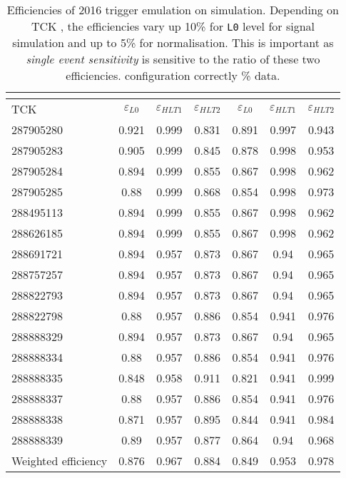 \begin{table}[H]
\begin{center}
\begin{tabular}{ l |  c  c  c | c  c  c }\toprule
	\multicolumn{1}{c|}{} & \multicolumn{3}{c|}{\Bmumumu } & \multicolumn{3}{c}{\bjpsimumuk} \\ \hline
 TCK & $\varepsilon_{L0}$ & $\varepsilon_{HLT1}$ & $\varepsilon_{HLT2}$ & $\varepsilon_{L0}$ & $\varepsilon_{HLT1}$ & $\varepsilon_{HLT2}$ \\
\hline
287905280 & 0.921 & 0.999 & 0.831 & 0.891 & 0.997 & 0.943 \\
287905283 & 0.905 & 0.999 & 0.845 & 0.878 & 0.998 & 0.953 \\
287905284 & 0.894 & 0.999 & 0.855 & 0.867 & 0.998 & 0.962 \\
287905285 & 0.88 & 0.999 & 0.868 & 0.854 & 0.998 & 0.973 \\
288495113 & 0.894 & 0.999 & 0.855 & 0.867 & 0.998 & 0.962 \\
288626185 & 0.894 & 0.999 & 0.855 & 0.867 & 0.998 & 0.962 \\
288691721 & 0.894 & 0.957 & 0.873 & 0.867 & 0.94 & 0.965 \\
288757257 & 0.894 & 0.957 & 0.873 & 0.867 & 0.94 & 0.965 \\
288822793 & 0.894 & 0.957 & 0.873 & 0.867 & 0.94 & 0.965 \\
288822798 & 0.88 & 0.957 & 0.886 & 0.854 & 0.941 & 0.976 \\
288888329 & 0.894 & 0.957 & 0.873 & 0.867 & 0.94 & 0.965 \\
288888334 & 0.88 & 0.957 & 0.886 & 0.854 & 0.941 & 0.976 \\
288888335 & 0.848 & 0.958 & 0.911 & 0.821 & 0.941 & 0.999 \\
288888337 & 0.88 & 0.957 & 0.886 & 0.854 & 0.941 & 0.976 \\
288888338 & 0.871 & 0.957 & 0.895 & 0.844 & 0.941 & 0.984 \\
288888339 & 0.89 & 0.957 & 0.877 & 0.864 & 0.94 & 0.968 \\
\hline
Weighted efficiency & 0.876 & 0.967 & 0.884 & 0.849 & 0.953 & 0.978 \\
\bottomrule
\end{tabular}
\end{center}
\caption{Efficiencies of 2016 trigger emulation on simulation. Depending on \DIFaddbeginFL {}\DIFaddendFL TCK \DIFaddbeginFL {}\DIFaddendFL , the efficiencies vary up 10\% for \texttt{L0} level for \DIFaddbeginFL {}\DIFaddendFL signal simulation and up to 5\% for normalisation\DIFdelbeginFL {}\DIFdelendFL . This is important as \DIFaddbeginFL {}\DIFaddendFL \textit{single event sensitivity} is sensitive to the ratio of these two efficiencies. \DIFdelbeginFL {}\DIFdelendFL \DIFaddbeginFL {}\DIFaddendFL configuration \DIFdelbeginFL {}\DIFdelendFL \DIFaddbeginFL {}\DIFaddendFL correctly \DIFdelbeginFL {}\% \DIFaddbeginFL {}\DIFaddendFL data\DIFdelbeginFL {}\DIFdelendFL .}

\end{table}
